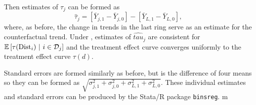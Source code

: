 \documentclass[10pt]{article}
\newcommand{\dist}{\text{Dist}}
\begin{document}
Then estimates of $\tau_j$ can be formed as
\[
    \hat{\tau}_j = \left[\bar{Y}_{j,1} - \bar{Y}_{j,0}\right] - \left[\bar{Y}_{L,1} - \bar{Y}_{L,0}\right],
\]
where, as before, the change in trends in the last ring serve as an estimate for the counterfactual trend. Under , estimates of $\hat{tau}_j$ are consistent for $\condexpec{\tau(\dist_i)}{i \in \mathcal{D}_j}$ and the treatment effect curve converges uniformly to the treatment effect curve $\tau(d)$. 

Standard errors are formed similarly as before, but is the difference of four means so they can be formed as $\sqrt{\sigma_{j,1}^2 + \sigma_{j,0}^2 + \sigma_{L,1}^2 + \sigma_{L,0}^2}$. These individual estimates and standard errors can be produced by the Stata/R package \texttt{binsreg}. m
\end{document}
